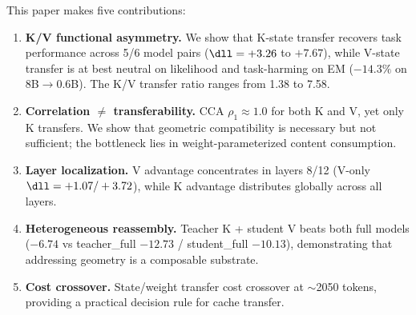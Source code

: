This paper makes five contributions:
\begin{enumerate}
  \item \textbf{K/V functional asymmetry.}
    We show that K-state transfer recovers task performance across 5/6 model pairs
    ($\dll = +3.26$ to $+7.67$), while V-state transfer is at best neutral
    on likelihood and task-harming on EM ($-14.3\%$ on 8B$\to$0.6B).
    The K/V transfer ratio ranges from 1.38 to 7.58.

  \item \textbf{Correlation $\neq$ transferability.}
    CCA $\rho_1 \approx 1.0$ for both K and V, yet only K transfers.
    We show that geometric compatibility is necessary but not sufficient;
    the bottleneck lies in weight-parameterized content consumption.

  \item \textbf{Layer localization.}
    V advantage concentrates in layers 8/12
    (V-only $\dll = +1.07 / +3.72$),
    while K advantage distributes globally across all layers.

  \item \textbf{Heterogeneous reassembly.}
    Teacher K + student V beats both full models
    ($-6.74$ vs teacher\_full $-12.73$ / student\_full $-10.13$),
    demonstrating that addressing geometry is a composable substrate.

  \item \textbf{Cost crossover.}
    State/weight transfer cost crossover at $\sim$2050 tokens,
    providing a practical decision rule for cache transfer.
\end{enumerate}

